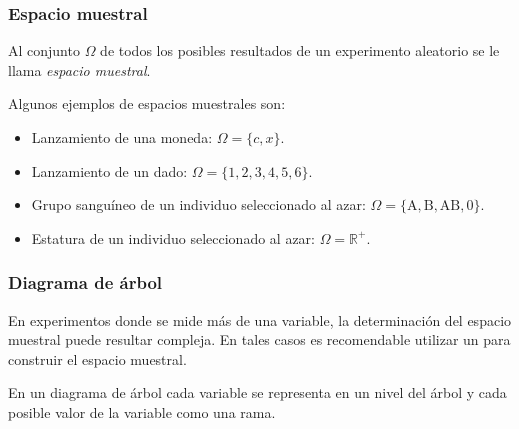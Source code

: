 \begin{frame}
\frametitle{Espacio muestral}
\begin{definicion}
Al conjunto $\Omega$ de todos los posibles resultados de un experimento aleatorio se le llama \emph{espacio muestral}.
\end{definicion}

Algunos ejemplos de espacios muestrales son:
\begin{itemize}
\item Lanzamiento de una moneda: $\Omega=\{c,x\}$.
\item Lanzamiento de un dado: $\Omega=\{1,2,3,4,5,6\}$.
\item Grupo sanguíneo de un individuo seleccionado al azar: $\Omega=\{\mbox{A},\mbox{B},\mbox{AB},\mbox{0}\}$.
\item Estatura de un individuo seleccionado al azar: $\Omega=\mathbb{R}^+$.
\end{itemize}

\end{frame}


\begin{frame}
\frametitle{Diagrama de árbol}
En experimentos donde se mide más de una variable, la determinación del espacio muestral puede resultar compleja. 
En tales casos es recomendable utilizar un  para construir el espacio muestral.
	
En un diagrama de árbol cada variable se representa en un nivel del árbol y cada posible valor de la variable como una rama. 
\end{frame}
	
